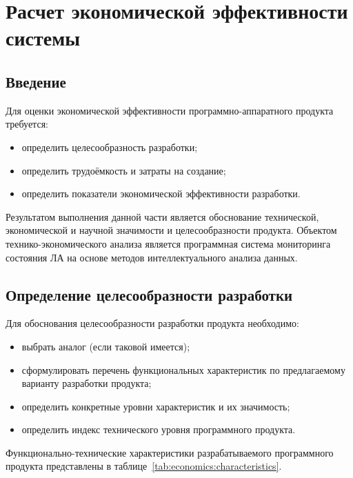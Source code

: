 \chapter{Расчет экономической эффективности системы}
\section{Введение}
Для оценки экономической эффективности программно-аппаратного продукта требуется:
\begin{itemize}
\item определить целесообразность разработки;
\item определить трудоёмкость и затраты на создание;
\item определить показатели экономической эффективности разработки.
\end{itemize}

Результатом выполнения данной части является обоснование технической, экономической и научной значимости и целесообразности продукта. Объектом технико-экономического анализа является программная система мониторинга состояния ЛА на основе методов интеллектуального анализа данных.

\section{Определение целесообразности разработки}
Для обоснования целесообразности разработки продукта необходимо:
\begin{itemize}
\item выбрать аналог (если таковой имеется);
\item сформулировать перечень функциональных характеристик по предлагаемому варианту разработки продукта;
\item определить конкретные уровни характеристик и их значимость;
\item определить индекс технического уровня программного продукта.
\end{itemize}

Функционально-технические характеристики разрабатываемого программного продукта представлены в таблице~\ref{tab:economics:characteristics}.

